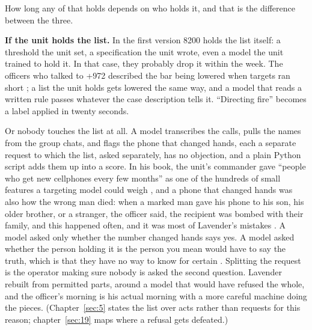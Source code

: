 How long any of that holds depends on who holds it, and that is the difference between the three.

\textbf{If the unit holds the list.} In the first version 8200 holds the list itself: a threshold the unit set, a specification the unit wrote, even a model the unit trained to hold it. In that case, they probably drop it within the week. The officers who talked to +972 described the bar being lowered when targets ran short \autocite{abraham2024lavender}; a list the unit holds gets lowered the same way, and a model that reads a written rule passes whatever the case description tells it. “Directing fire” becomes a label applied in twenty seconds.

Or nobody touches the list at all. A model transcribes the calls, pulls the names from the group chats, and flags the phone that changed hands, each a separate request to which the list, asked separately, has no objection, and a plain Python script adds them up into a score. In his book, the unit's commander gave “people who get new cellphones every few months” as one of the hundreds of small features a targeting model could weigh \autocite[ch.~3]{ys2021humanmachine}, and a phone that changed hands was also how the wrong man died: when a marked man gave his phone to his son, his older brother, or a stranger, the officer said, the recipient was bombed with their family, and this happened often, and it was most of Lavender's mistakes \autocite{abraham2024lavender}. A model asked only whether the number changed hands says yes. A model asked whether the person holding it is the person you mean would have to say the truth, which is that they have no way to know for certain \autocite{abraham2024lavender}. Splitting the request is the operator making sure nobody is asked the second question. Lavender rebuilt from permitted parts, around a model that would have refused the whole, and the officer's morning is his actual morning with a more careful machine doing the pieces. (Chapter~\ref{sec:5} states the list over acts rather than requests for this reason; chapter~\ref{sec:19} maps where a refusal gets defeated.)

